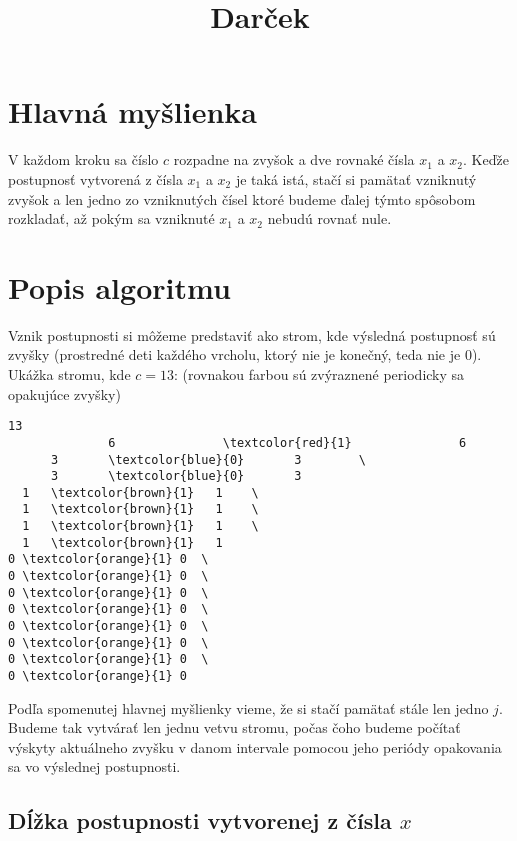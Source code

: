 \documentclass[10pt]{article}
\title{\vspace{-3cm}Darček}
\begin{document}
\author{}
\date{}
\maketitle

\section*{Hlavná myšlienka}

V každom kroku sa číslo $c$ rozpadne na zvyšok a dve rovnaké čísla $x_1$ a
$x_2$. Keďže postupnosť vytvorená z čísla $x_1$ a $x_2$ je taká istá, stačí si
pamätať vzniknutý zvyšok a len jedno zo vzniknutých čísel ktoré budeme ďalej
týmto spôsobom rozkladať, až pokým sa vzniknuté $x_1$ a $x_2$ nebudú rovnať
nule.

\section*{Popis algoritmu}

Vznik postupnosti si môžeme predstaviť ako strom, kde výsledná postupnosť sú
zvyšky (prostredné deti každého vrcholu, ktorý nie je konečný, teda nie je
$0$). Ukážka stromu, kde $c=13$: (rovnakou farbou sú zvýraznené periodicky sa
opakujúce zvyšky)

\begin{Verbatim}[commandchars=\\\{\}]
                             13 
              6               \textcolor{red}{1}               6
      3       \textcolor{blue}{0}       3        \
      3       \textcolor{blue}{0}       3
  1   \textcolor{brown}{1}   1    \
  1   \textcolor{brown}{1}   1    \
  1   \textcolor{brown}{1}   1    \
  1   \textcolor{brown}{1}   1
0 \textcolor{orange}{1} 0  \
0 \textcolor{orange}{1} 0  \
0 \textcolor{orange}{1} 0  \
0 \textcolor{orange}{1} 0  \
0 \textcolor{orange}{1} 0  \
0 \textcolor{orange}{1} 0  \
0 \textcolor{orange}{1} 0  \
0 \textcolor{orange}{1} 0

\end{Verbatim}

Podľa spomenutej hlavnej myšlienky vieme, že si stačí pamätať stále len jedno
$j$. Budeme tak vytvárať len jednu vetvu stromu, počas čoho budeme počítať
výskyty aktuálneho zvyšku v danom intervale pomocou jeho periódy opakovania sa
vo výslednej postupnosti.

\subsection*{Dĺžka postupnosti vytvorenej z čísla $x$}
\end{document}
